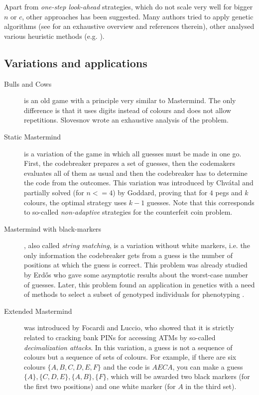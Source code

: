 Apart from \emph{one-step look-ahead} strategies,
  which do not scale very well for bigger $n$ or $c$,
  other approaches has been suggested.
Many authors tried to apply genetic algorithms
  (see \cite{mm-ga} for an exhaustive overview and references therein),
  other analysed various heuristic methods (e.g. \cite{mm-heuristic}).

\subsection{Variations and applications}

\begin{description}
\item[Bulls and Cows]
is an old game with a principle very similar to Mastermind.
The only difference is that it uses digits instead of colours and does not allow repetitions.
Slovesnov wrote an exhaustive analysis of the problem\cite[see][]{bullsandcows}.

\item[Static Mastermind] is a variation of the game in which all guesses
  must be made in one go.
First, the codebreaker prepares a set of guesses,
  then the codemakers evaluates all of them as usual and
  then the codebreaker has to determine the code from the outcomes.
This variation was introduced by Chvátal\cite{mm-chvatal} and
  partially solved (for $n<=4$) by Goddard\cite{mm-static},
  proving that for $4$ pegs and $k$ colours,
  the optimal strategy uses $k-1$ guesses.
Note that this corresponds to so-called \emph{non-adaptive} strategies
  for the counterfeit coin problem.

\item[Mastermind with black-markers], also called \emph{string matching},
  is a variation without white markers, i.e.
  the only information the codebreaker gets from a guess
  is the number of positions at which the guess is correct.
This problem was already studied by Erdős\cite{erdos-two} who gave some
  asymptotic results about the worst-case number of guesses.
Later, this problem found an application in genetics with a need of
  methods to select a subset of genotyped individuals for phenotyping
  \cite{mm-app-gen2}\cite{mm-app-gen}.

\item[Extended Mastermind] was introduced by Focardi and Luccio,
  who showed that it is strictly related to cracking bank PINs for accessing ATMs
  by so-called \emph{decimalization attacks}\cite{mm-pins}.
In this variation, a guess is not a sequence of colours but a sequence of
  sets of colours. For example, if there are six colours $\{A, B, C, D, E, F\}$
  and the code is $AECA$,
  you can make a guess $\{A\}, \{C,D,E\}, \{A,B\}, \{F\}$, which
  will be awarded two black markers (for the first two positions)
  and one white marker (for $A$ in the third set).
\end{description}

